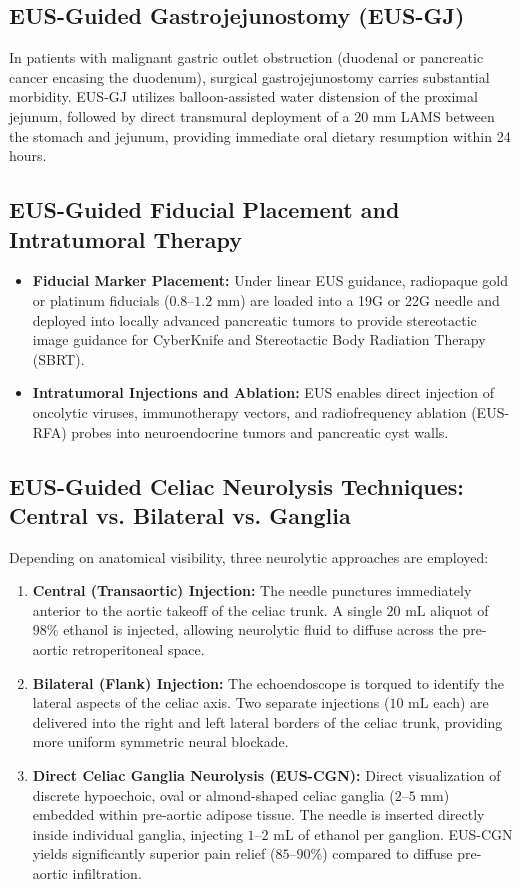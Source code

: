 \documentclass[11pt,a4paper]{article}
\begin{document}
\subsection{EUS-Guided Gastrojejunostomy (EUS-GJ)}
In patients with malignant gastric outlet obstruction (duodenal or pancreatic cancer encasing the duodenum), surgical gastrojejunostomy carries substantial morbidity. EUS-GJ utilizes balloon-assisted water distension of the proximal jejunum, followed by direct transmural deployment of a $20\text{ mm}$ LAMS between the stomach and jejunum, providing immediate oral dietary resumption within 24 hours.

\subsection{EUS-Guided Fiducial Placement and Intratumoral Therapy}
\begin{itemize}[leftmargin=2em]
    \item \textbf{Fiducial Marker Placement:} Under linear EUS guidance, radiopaque gold or platinum fiducials ($0.8\text{--}1.2\text{ mm}$) are loaded into a 19G or 22G needle and deployed into locally advanced pancreatic tumors to provide stereotactic image guidance for CyberKnife and Stereotactic Body Radiation Therapy (SBRT).
    \item \textbf{Intratumoral Injections and Ablation:} EUS enables direct injection of oncolytic viruses, immunotherapy vectors, and radiofrequency ablation (EUS-RFA) probes into neuroendocrine tumors and pancreatic cyst walls.
\end{itemize}

\subsection{EUS-Guided Celiac Neurolysis Techniques: Central vs. Bilateral vs. Ganglia}
Depending on anatomical visibility, three neurolytic approaches are employed:
\begin{enumerate}[leftmargin=2em]
    \item \textbf{Central (Transaortic) Injection:} The needle punctures immediately anterior to the aortic takeoff of the celiac trunk. A single $20\text{ mL}$ aliquot of $98\%$ ethanol is injected, allowing neurolytic fluid to diffuse across the pre-aortic retroperitoneal space.
    \item \textbf{Bilateral (Flank) Injection:} The echoendoscope is torqued to identify the lateral aspects of the celiac axis. Two separate injections ($10\text{ mL}$ each) are delivered into the right and left lateral borders of the celiac trunk, providing more uniform symmetric neural blockade.
    \item \textbf{Direct Celiac Ganglia Neurolysis (EUS-CGN):} Direct visualization of discrete hypoechoic, oval or almond-shaped celiac ganglia ($2\text{--}5\text{ mm}$) embedded within pre-aortic adipose tissue. The needle is inserted directly inside individual ganglia, injecting $1\text{--}2\text{ mL}$ of ethanol per ganglion. EUS-CGN yields significantly superior pain relief ($85\text{--}90\%$) compared to diffuse pre-aortic infiltration.
\end{enumerate}
\end{document}
